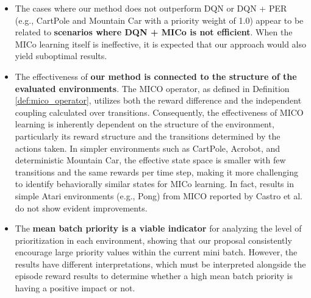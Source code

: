 \begin{itemize}
    \item The cases where our method does not outperform DQN or DQN + PER (e.g., CartPole and Mountain Car with a priority weight of 1.0) appear to be related to \textbf{scenarios where DQN + MICo is not efficient}. When the MICo learning itself is ineffective, it is expected that our approach would also yield suboptimal results.
    \item The effectiveness of \textbf{our method is connected to the structure of the evaluated environments}. The MICO operator, as defined in Definition \ref{def:mico_operator}, utilizes both the reward difference and the independent coupling calculated over transitions. Consequently, the effectiveness of MICO learning is inherently dependent on the structure of the environment, particularly its reward structure and the transitions determined by the actions taken. In simpler environments such as CartPole, Acrobot, and deterministic Mountain Car, the effective state space is smaller with few transitions and the same rewards per time step, making it more challenging to identify behaviorally similar states for MICo learning.  In fact, results in simple Atari environments (e.g., Pong) from MICO reported by Castro et al. \cite{castro2021mico} do not show evident improvements.
    \item The \textbf{mean batch priority is a viable indicator} for analyzing the level of prioritization in each environment, showing that our proposal consistently encourage large priority values within the current mini batch. However, the results have different interpretations, which must be interpreted alongside the episode reward results to determine whether a high mean batch priority is having a positive impact or not.
\end{itemize}